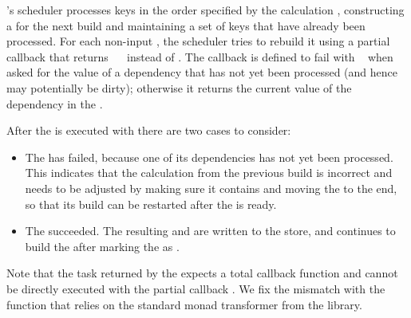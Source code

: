 \Excel's  scheduler processes keys in the order specified by the
calculation , constructing a  for the next build and
maintaining a set of keys  that have already been processed. For each
non-input , the scheduler tries to rebuild it using a partial 
callback that returns ~~ instead of . The callback
is defined to fail with ~ when asked for the value of a
dependency  that has not yet been processed (and hence may potentially
be dirty); otherwise it returns the current value of the dependency in the
.

After the  is executed with  there are two cases to
consider:

\begin{itemize}
    \item The  has failed, because one of its dependencies 
    has not yet been processed. This indicates that the calculation 
    from the previous build is incorrect and needs to be adjusted by making sure
    it contains  and moving the  to the end, so that its build
    can be restarted after the  is ready.
    \item The  succeeded. The resulting  and
     are written to the store, and \Excel continues to build the
     after marking the  as .
\end{itemize}

Note that the task returned by the  expects a total callback
function and cannot be directly executed with the partial callback .
We fix the mismatch with the function  that relies on the standard
monad transformer  from the  library.

